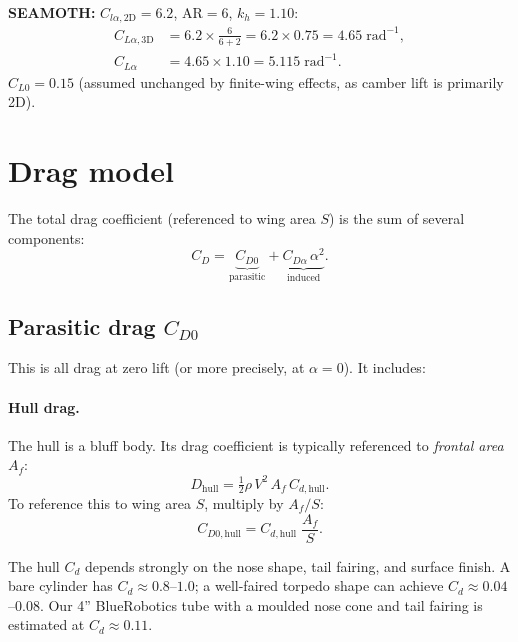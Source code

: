 \documentclass[11pt,a4paper]{article}
\newcommand{\half}{\tfrac{1}{2}}
\newcommand{\note}[1]{\par\smallskip\noindent\colorbox{blue!8}{\parbox{\dimexpr\linewidth-2\fboxsep}{%
  \small\textbf{SEAMOTH:} #1}}\smallskip}
\begin{document}
\note{$C_{l\alpha,\text{2D}}=6.2$, $\mathrm{AR}=6$, $k_h=1.10$:
\begin{align*}
  C_{L\alpha,\text{3D}} &= 6.2 \times \frac{6}{6+2} = 6.2 \times 0.75 = 4.65\;\mathrm{rad}^{-1}, \\
  C_{L\alpha} &= 4.65 \times 1.10 = \mathbf{5.115}\;\mathrm{rad}^{-1}.
\end{align*}
$C_{L0} = 0.15$ (assumed unchanged by finite-wing effects, as camber lift is primarily 2D).}


\section{Drag model}
\label{sec:drag}

The total drag coefficient (referenced to wing area $S$) is the sum of several
components:
\begin{equation}
  C_D = \underbrace{C_{D0}}_{\text{parasitic}} + \underbrace{C_{D\alpha}\,\alpha^2}_{\text{induced}}.
  \label{eq:CDtotal}
\end{equation}

\subsection{Parasitic drag $C_{D0}$}

This is all drag at zero lift (or more precisely, at $\alpha=0$).  It includes:

\paragraph{Hull drag.}
The hull is a bluff body.  Its drag coefficient is typically referenced to
\emph{frontal area} $A_f$:
\begin{equation}
  D_\text{hull} = \half\rho\,V^2\,A_f\,C_{d,\text{hull}}.
\end{equation}
To reference this to wing area $S$, multiply by $A_f/S$:
\begin{equation}
  C_{D0,\text{hull}} = C_{d,\text{hull}}\;\frac{A_f}{S}.
  \label{eq:cd0hull}
\end{equation}

The hull $C_d$ depends strongly on the nose shape, tail fairing, and surface finish.
A bare cylinder has $C_d\approx0.8$--$1.0$; a well-faired torpedo shape can achieve
$C_d\approx0.04$--$0.08$.  Our 4'' BlueRobotics tube with a moulded nose cone and
tail fairing is estimated at $C_d\approx0.11$.
\end{document}
